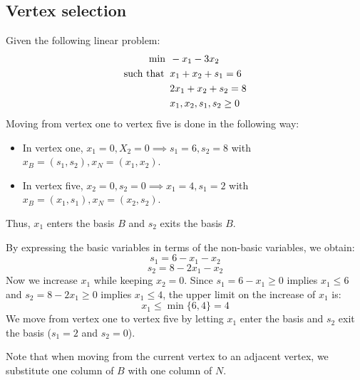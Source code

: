 














\subsection*{Vertex selection}
\begin{example}
    Given the following linear problem: 
    \begin{align*}
        \min                      \:&\: -x_1-3x_2          \\
        \textnormal{such that }     &\: x_1+x_2+s_1 = 6  \\
                                    &\: 2x_1+x_2+s_2 = 8  \\
                                    &\: x_1,x_2,s_1,s_2 \geq 0
    \end{align*}
    Moving from vertex one to vertex five is done in the following way: 
    \begin{itemize}
        \item In vertex one, $x_1 = 0, X_2=0 \implies s_1 = 6, s_2 = 8$ with $x_B = (s_1, s_2), x_N = (x_1, x_2)$.
        \item In vertex five, $x_2=0,s_2=0 \implies x_1=4,s_1=2$ with $x_B = (x_1, s_1), x_N = (x_2, s_2)$.
    \end{itemize}
    Thus, $x_1$ enters the basis $B$ and $s_2$ exits the basis $B$. 

    By expressing the basic variables in terms of the non-basic variables, we obtain: 
    \[s_1=6-x_1-x_2\]
    \[s_2=8-2x_1-x_2\]
    Now we increase $x_1$ while keeping $x_2=0$. 
    Since $s_1=6-x_1 \geq 0$ implies $x_1 \leq 6$ and $s_2=8-2x_1 \geq 0$ implies $x_1 \leq 4$, the upper limit on the increase of $x_1$ is: 
    \[x_1 \leq \min\{6,4\}=4\]
    We move from vertex one to vertex five by letting $x_1$ enter the basis and $s_2$ exit the basis ($s_1=2$ and $s_2=0$). 
\end{example}
Note that when moving from the current vertex to an adjacent vertex, we substitute one column of $B$ with one column of $N$. 

